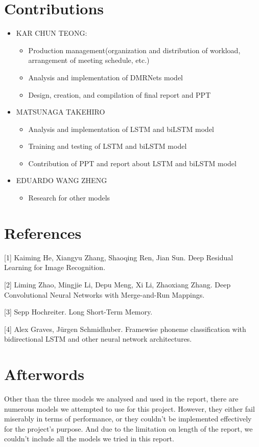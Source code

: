 \documentclass{article}
\begin{document}
\newpage

\section{Contributions}
\begin{itemize}
\item KAR CHUN TEONG: 
\begin{itemize}
\item Production management(organization and distribution of workload, arrangement of meeting schedule, etc.)
\item Analysis and implementation of DMRNets model
\item Design, creation, and compilation of final report and PPT
\end{itemize}
\item MATSUNAGA TAKEHIRO
\begin{itemize}
\item Analysis and implementation of LSTM and biLSTM model
\item Training and testing of LSTM and biLSTM model
\item Contribution of PPT and report about LSTM and biLSTM model
\end{itemize}
\item EDUARDO WANG ZHENG
\begin{itemize}
\item Research for other models
\end{itemize}
\end{itemize}

\section{References}
\medskip

\small

[1] Kaiming He, Xiangyu Zhang, Shaoqing Ren, Jian Sun. Deep Residual Learning for Image Recognition.

[2] Liming Zhao, Mingjie Li, Depu Meng, Xi Li, Zhaoxiang Zhang. Deep Convolutional Neural Networks with Merge-and-Run Mappings.

[3] Sepp Hochreiter. Long Short-Term Memory. 

[4] Alex Graves, Jürgen Schmidhuber. Framewise phoneme classification with bidirectional LSTM and other neural network architectures. 


\section{Afterwords}
Other than the three models we analysed and used in the report, there are numerous models we attempted to use for this project. However, they either fail miserably in terms of performance, or they couldn't be implemented effectively for the project's purpose. And due to the limitation on length of the report, we couldn't include all the models we tried in this report.
\end{document}
